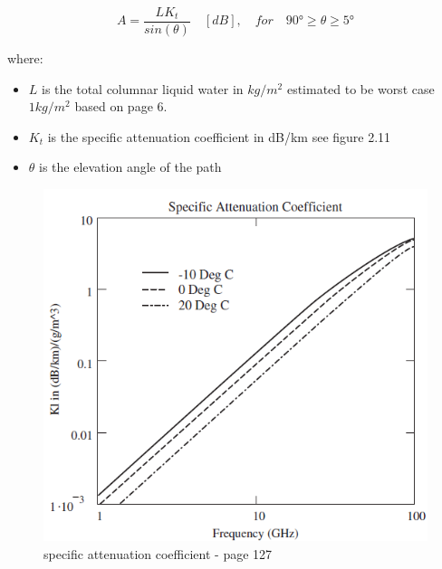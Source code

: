 \begin{equation}
    A = \frac{LK_t}{sin(\theta)} \quad [dB], \quad for \quad \ang{90}\geq\theta\geq\ang{5}
\end{equation}

where:

\begin{itemize}
  \item $L$ is the total columnar liquid water in $kg/m^2$ estimated to be worst case $1kg/m^2$ based on \cite{ITUCloud} page 6. 
  \item $K_t$ is the specific attenuation coefficient in dB/km see figure 2.11
  \item $\theta$ is the elevation angle of the path
\end{itemize}

\begin{figure}[h]
\centering
\includegraphics[scale=0.7]{figures/Kl.PNG}
\caption{specific attenuation coefficient\cite{RFpropagation} - page 127}
\end{figure}

